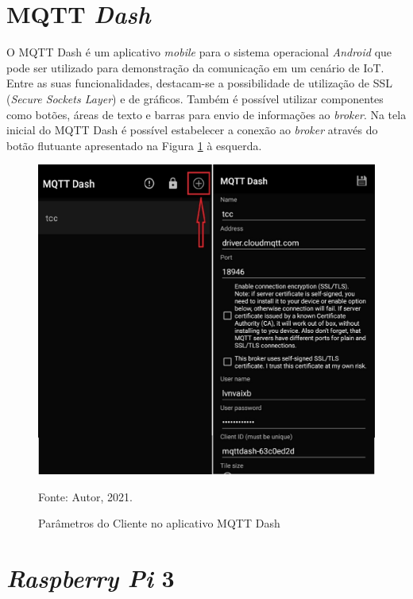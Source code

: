 \documentclass[
12pt,
openany, %
oneside, %
a4paper,			
english,			
brazil			        %
]{abntbibufjf}
\begin{document}
	\section{MQTT \textit{Dash}}
	
	O MQTT Dash é um aplicativo \textit{mobile} para o sistema operacional \textit{Android} que pode ser utilizado para demonstração da comunicação em um cenário de IoT. Entre as suas funcionalidades, destacam-se a possibilidade de utilização de SSL (\textit{Secure Sockets Layer}) e de gráficos. Também é possível utilizar componentes como botões, áreas de texto e barras para envio de informações ao \textit{broker}. Na tela inicial do MQTT Dash é possível estabelecer a conexão ao \textit{broker} através do botão flutuante apresentado na Figura \ref{MQTTdash} à esquerda.
	
	
	\begin{figure}[!htb]
		\centering
		\includegraphics[scale=0.3]{Figuras/mqttDash.jpeg}
		\caption{Parâmetros do Cliente no aplicativo MQTT Dash}
		\label{MQTTdash}
		\par Fonte: Autor, 2021.
	\end{figure}
	
	
    \section{\textit{Raspberry Pi} 3}
    
\end{document}
